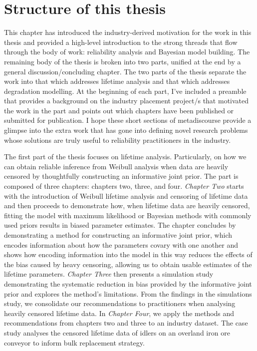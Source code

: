 \section{Structure of this thesis}
\label{sec:thesis-structure}

This chapter has introduced the industry-derived motivation for the work in this thesis and provided a high-level introduction to the strong threads that flow through the body of work: reliability analysis and Bayesian model building. The remaining body of the thesis is broken into two parts, unified at the end by a general discussion/concluding chapter. The two parts of the thesis separate the work into that which addresses lifetime analysis and that which addresses degradation modelling. At the beginning of each part, I've included a preamble that provides a background on the industry placement project/s that motivated the work in the part and points out which chapters have been published or submitted for publication. I hope these short sections of metadiscourse provide a glimpse into the extra work that has gone into defining novel research problems whose solutions are truly useful to reliability practitioners in the industry.

The first part of the thesis focuses on lifetime analysis. Particularly, on how we can obtain reliable inference from Weibull analysis when data are heavily censored by thoughtfully constructing an informative joint prior. The part is composed of three chapters: chapters two, three, and four. \textit{Chapter Two} starts with the introduction of Weibull lifetime analysis and censoring of lifetime data and then proceeds to demonstrate how, when lifetime data are heavily censored, fitting the model with maximum likelihood or Bayesian methods with commonly used priors results in biased parameter estimates. The chapter concludes by demonstrating a method for constructing an informative joint prior, which encodes information about how the parameters covary with one another and shows how encoding information into the model in this way reduces the effects of the bias caused by heavy censoring, allowing us to obtain usable estimates of the lifetime parameters. \textit{Chapter Three} then presents a simulation study demonstrating the systematic reduction in bias provided by the informative joint prior and explores the method's limitations. From the findings in the simulations study, we consolidate our recommendations to practitioners when analysing heavily censored lifetime data. In \textit{Chapter Four}, we apply the methods and recommendations from chapters two and three to an industry dataset. The case study analyses the censored lifetime data of idlers on an overland iron ore conveyor to inform bulk replacement strategy.

